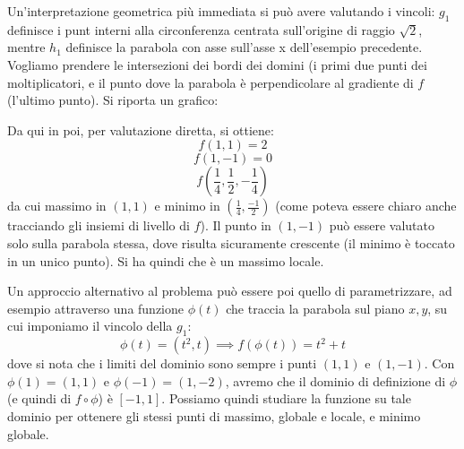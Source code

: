\documentclass[a4paper,11pt]{article}
\begin{document}
\begin{enumerate}
Un'interpretazione geometrica più immediata si può avere valutando i vincoli: $g_1$ definisce i punt interni alla circonferenza centrata sull'origine di raggio $\sqrt{2}$, mentre $h_1$ definisce la parabola con asse sull'asse x dell'esempio precedente.
Vogliamo prendere le intersezioni dei bordi dei domini (i primi due punti dei moltiplicatori, e il punto dove la parabola è perpendicolare al gradiente di $f$ (l'ultimo punto).
Si riporta un grafico:
\begin{center}

\end{center}
Da qui in poi, per valutazione diretta, si ottiene:
$$
f(1,1) = 2
$$
$$
f(1, -1) = 0
$$
$$
f(\frac{1}{4}, \frac{1}{2}, -\frac{1}{4})
$$
da cui massimo in $(1,1)$ e minimo in $(\frac{1}{4}, \frac{-1}{2})$ (come poteva essere chiaro anche tracciando gli insiemi di livello di $f$).
Il punto in $(1, -1)$ può essere valutato solo sulla parabola stessa, dove risulta sicuramente crescente (il minimo è toccato in un unico punto).
Si ha quindi che è un massimo locale.

Un approccio alternativo al problema può essere poi quello di parametrizzare, ad esempio attraverso una funzione $\phi(t)$ che traccia la parabola sul piano $x,y$, su cui imponiamo il vincolo della $g_1$:
$$
\phi(t) = (t^2, t) \implies f(\phi(t)) = t^2 + t
$$
dove si nota che i limiti del dominio sono sempre i punti $(1,1)$ e $(1, -1)$.
Con $\phi(1) = (1,1)$ e $\phi(-1) = (1, -2)$, avremo che il dominio di definizione di $\phi$ (e quindi di $f \circ \phi$) è $[-1, 1]$.
Possiamo quindi studiare la funzione su tale dominio per ottenere gli stessi punti di massimo, globale e locale, e minimo globale.


\end{enumerate}
\end{document}
